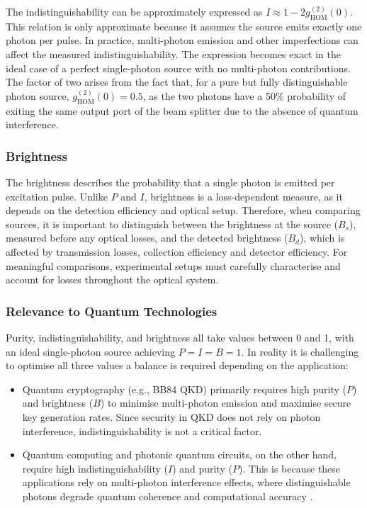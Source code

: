 The indistinguishability can be approximately expressed as $ I \approx 1 - 2g^{(2)}_{\text{HOM}}(0) $. This relation is only approximate because it assumes the source emits exactly one photon per pulse. In practice, multi-photon emission and other imperfections can affect the measured indistinguishability. The expression becomes exact in the ideal case of a perfect single-photon source with no multi-photon contributions. The factor of two arises from the fact that, for a pure but fully distinguishable photon source, $ g^{(2)}_{\text{HOM}}(0) = 0.5 $, as the two photons have a 50\% probability of exiting the same output port of the beam splitter due to the absence of quantum interference. 


\subsubsection{Brightness}

The brightness describes the probability that a single photon is emitted per excitation pulse. Unlike $P$ and $I$, brightness is a loss-dependent measure, as it depends on the detection efficiency and optical setup. Therefore, when comparing sources, it is important to distinguish between the brightness at the source ($B_s$), measured before any optical losses, and the detected brightness ($B_d$), which is affected by transmission losses, collection efficiency and detector efficiency. For meaningful comparisons, experimental setups must carefully characterise and account for losses throughout the optical system.

\subsubsection{Relevance to Quantum Technologies}
Purity, indistinguishability, and brightness all take values between 0 and 1, with an ideal single-photon source achieving $P = I = B = 1$. In reality it is challenging to optimise all three values a balance is required depending on the application:

\begin{itemize}
    \item Quantum cryptography (e.g., BB84 QKD) primarily requires high purity ($P$) and brightness ($B$) to minimise multi-photon emission and maximise secure key generation rates. Since security in QKD does not rely on photon interference, indistinguishability is not a critical factor.  
    \item Quantum computing and photonic quantum circuits, on the other hand, require high indistinguishability ($I$) and purity ($P$). This is because these applications rely on multi-photon interference effects, where distinguishable photons degrade quantum coherence and computational accuracy \cite{Bogaerts2020}.  
\end{itemize}



